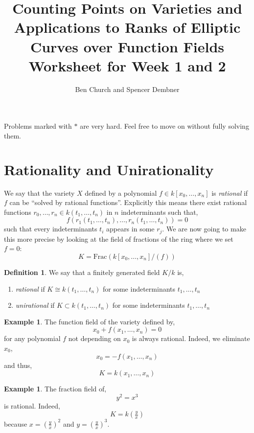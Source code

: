 \documentclass[12pt]{article}
\theoremstyle{remark}
\theoremstyle{definition}
\newtheorem{example}[theorem]{Example}
\newtheorem{defn}[theorem]{Definition}
\newcommand{\Frac}[1]{\mathrm{Frac}\left(#1\right)}
\begin{document}
\title{Counting Points on Varieties and Applications to Ranks of Elliptic Curves over Function Fields \bigskip\\
\Large Worksheet for Week 1 and 2}

\author{Ben Church and Spencer Dembner}

\maketitle 

Problems marked with $*$ are very hard. Feel free to move on without fully solving them. 

\section{Rationality and Unirationality}


We say that the variety $X$ defined by a polynomial $f \in k[x_0, \dots, x_n]$ is \textit{rational} if $f$ can be ``solved by rational functions''. Explicitly this means there exist rational functions $r_0, \dots, r_n \in k(t_1, \dots, t_n)$ in $n$ indeterminants such that,
\[ f(r_1(t_1, \dots, t_n), \dots, r_n(t_1, \dots, t_n)) = 0 \]
such that every indeterminants $t_i$ appears in some $r_j$. We are now going to make this more precise by looking at the field of fractions of the ring where we set $f = 0$:
\[ K = \Frac{k[x_0, \dots, x_n]/(f)} \]

\begin{defn}
We say that a finitely generated field $K / k$ is,
\begin{enumerate}
\item \textit{rational} if $K \cong k(t_1, \dots, t_n)$ for some indeterminants $t_1, \dots, t_n$

\item \textit{unirational} if $K \subset k(t_1, \dots, t_n)$ for some indeterminants $t_1, \dots, t_n$
\end{enumerate}
\end{defn}

\begin{example}
The function field of the variety defined by,
\[ x_0 + f(x_1, \dots, x_n) = 0 \]
for any polynomial $f$ not depending on $x_0$ is always rational. Indeed, we eliminate $x_0$,
\[ x_0 = - f(x_1, \dots, x_n) \]
and thus,
\[ K = k(x_1, \dots, x_n) \]
\end{example}

\begin{example}
The fraction field of,
\[ y^2 = x^3 \]
is rational. Indeed,
\[ K = k(\tfrac{y}{x}) \]
because $x = (\tfrac{y}{x})^2$ and $y = (\tfrac{y}{x})^3$. 
\end{example}
\end{document}
